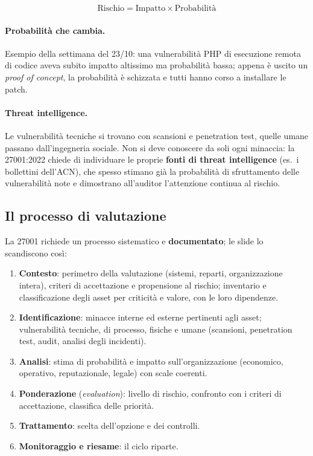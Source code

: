 \[
\text{Rischio} = \text{Impatto} \times \text{Probabilità}
\]

\paragraph{Probabilità che cambia.} Esempio della settimana del 23/10: una vulnerabilità PHP di esecuzione
remota di codice aveva subito impatto altissimo ma probabilità bassa; appena è uscito un \emph{proof of
concept}, la probabilità è schizzata e tutti hanno corso a installare le patch.

\paragraph{Threat intelligence.} Le vulnerabilità tecniche si trovano con scansioni e penetration test,
quelle umane passano dall'ingegneria sociale. Non si deve conoscere da soli ogni minaccia: la 27001:2022
chiede di individuare le proprie \textbf{fonti di threat intelligence} (es.\ i bollettini dell'ACN), che
spesso stimano già la probabilità di sfruttamento delle vulnerabilità note e dimostrano all'auditor
l'attenzione continua al rischio.

\subsection{Il processo di valutazione}
La 27001 richiede un processo sistematico e \textbf{documentato}; le slide lo scandiscono così:
\begin{enumerate}
  \item \textbf{Contesto}: perimetro della valutazione (sistemi, reparti, organizzazione intera), criteri di
    accettazione e propensione al rischio; inventario e classificazione degli asset per criticità e valore,
    con le loro dipendenze.
  \item \textbf{Identificazione}: minacce interne ed esterne pertinenti agli asset; vulnerabilità tecniche,
    di processo, fisiche e umane (scansioni, penetration test, audit, analisi degli incidenti).
  \item \textbf{Analisi}: stima di probabilità e impatto sull'organizzazione (economico, operativo,
    reputazionale, legale) con scale coerenti.
  \item \textbf{Ponderazione} (\emph{evaluation}): livello di rischio, confronto con i criteri di
    accettazione, classifica delle priorità.
  \item \textbf{Trattamento}: scelta dell'opzione e dei controlli.
  \item \textbf{Monitoraggio e riesame}: il ciclo riparte.
\end{enumerate}

